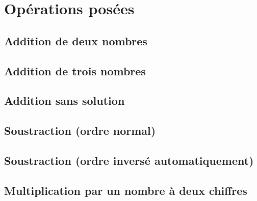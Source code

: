 \documentclass[11pt,a4paper]{article}
\begin{document}
\section{Opérations posées}

\subsection{Addition de deux nombres}

\begin{center}
\end{center}

\subsection{Addition de trois nombres}

\begin{center}
\end{center}

\subsection{Addition sans solution}

\begin{center}
\end{center}

\subsection{Soustraction (ordre normal)}

\begin{center}
\end{center}

\subsection{Soustraction (ordre inversé automatiquement)}

\begin{center}
\end{center}

\subsection{Multiplication par un nombre à deux chiffres}
\end{document}
